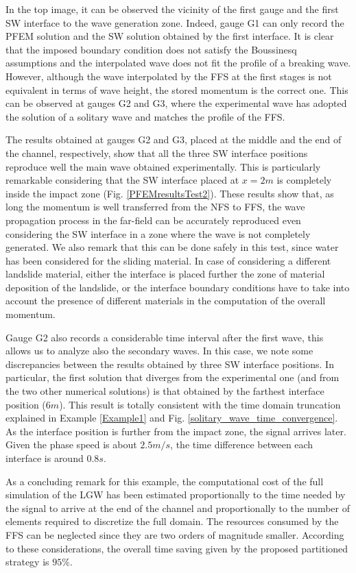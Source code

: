 In the top image, it can be observed the vicinity of the first gauge and the first SW interface to the wave generation zone. Indeed, gauge G1 can only record the PFEM solution and the SW solution obtained by the first interface. It is clear that the imposed boundary condition does not satisfy the Boussinesq assumptions and the interpolated wave does not fit the profile of a breaking wave.
However, although the wave interpolated by the FFS at the first stages is not equivalent in terms of wave height, the stored momentum is the correct one. This can be observed at gauges G2 and G3, where the experimental wave has adopted the solution of a solitary wave and matches the profile of the FFS.

The results obtained at gauges G2 and G3, placed at the middle and the end of the channel, respectively, show that all the three SW interface positions reproduce well the main wave obtained experimentally. This is particularly remarkable considering that the SW interface placed at $x=2m$ is completely inside the impact zone (Fig. \ref{PFEMresultsTest2}). These results show that, as long the momentum is well transferred from the NFS to FFS, the wave propagation process in the far-field can be accurately reproduced even considering the SW interface in a zone where the wave is not completely generated. We also remark that this can be done safely in this test, since water has been considered for the sliding material. In case of considering a different landslide material, either the interface is placed further the zone of material deposition of the landslide, or the interface boundary conditions have to take into account the presence of different materials in the computation of the overall momentum.

Gauge G2 also records a considerable time interval after the first wave, this allows us to analyze also the secondary waves. In this case, we note some discrepancies between the results obtained by three SW interface positions. In particular, the first solution that diverges from the experimental one (and from the two other numerical solutions) is that obtained by the farthest interface position ($6m$). This result is totally consistent with the time domain truncation explained in Example \ref{Example1} and Fig. \ref{solitary_wave_time_convergence}. As the interface position is further from the impact zone, the signal arrives later. Given the phase speed is about $2.5m/s$, the time difference between each interface is around $0.8s$.


As a concluding remark for this example, the computational cost of the full simulation of the LGW has been estimated proportionally to the time needed by the signal to arrive at the end of the channel and proportionally to the number of elements required to discretize the full domain. The resources consumed by the FFS can be neglected since they are two orders of magnitude smaller. According to these considerations, the overall time saving given by the proposed partitioned strategy is $95\%$.



